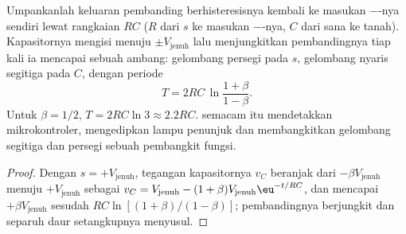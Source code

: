 \begin{proposition}\label{prop:b2:feedback-oscillators:astable}
Umpankanlah keluaran pembanding berhisteresisnya kembali ke masukan $-$-nya sendiri
lewat rangkaian $RC$ ($R$ dari $s$ ke masukan $-$-nya, $C$ dari sana
ke tanah). Kapasitornya mengisi menuju $\pm V_{\text{jenuh}}$ lalu menjungkitkan
pembandingnya tiap kali ia mencapai sebuah ambang: gelombang persegi pada $s$,
gelombang nyaris segitiga pada $C$, dengan periode
\[
T = 2RC\,\ln\frac{1 + \beta}{1 - \beta} .
\]
Untuk $\beta = 1/2$, $T = 2RC\ln3 \approx 2.2RC$. \emph{}
semacam itu mendetakkan mikrokontroler, mengedipkan lampu penunjuk dan membangkitkan
gelombang segitiga dan persegi sebuah pembangkit fungsi.
\end{proposition}

\begin{proof}
Dengan $s = +V_{\text{jenuh}}$, tegangan kapasitornya $v_C$ beranjak dari
$-\beta V_{\text{jenuh}}$ menuju $+V_{\text{jenuh}}$ sebagai $v_C = V_{\text{jenuh}} - (1 + \beta)
V_{\text{jenuh}}\eu^{-t/RC}$, dan mencapai $+\beta V_{\text{jenuh}}$ sesudah $RC\ln[(1 + \beta)
/(1 - \beta)]$; pembandingnya berjungkit dan separuh daur setangkupnya menyusul.
\end{proof}

